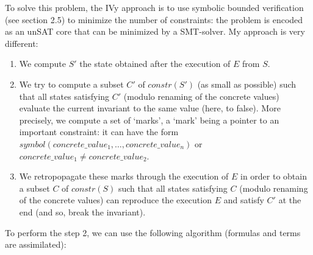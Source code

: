 \documentclass[11pt,a4paper,oldfontcommands,openany]{memoir}
\begin{document}
    To solve this problem, the IVy approach is to use symbolic bounded verification (see section 2.5) to minimize the number of constraints: the problem is encoded as an unSAT core that can be minimized by a SMT-solver.
    My approach is very different:
    \begin{enumerate}
        \item We compute \(S'\) the state obtained after the execution of \(E\) from \(S\).
        \item We try to compute a subset \(C'\) of \(constr(S')\) (as small as possible) such that all states satisfying \(C'\) (modulo renaming of the concrete values)
        evaluate the current invariant to the same value (here, to false). More precisely, we compute a set of `marks', a `mark' being a pointer to an important constraint:
        it can have the form \(symbol(concrete\_value_1,\ldots,concrete\_value_n)\) or \(concrete\_value_1 \neq concrete\_value_2\).
        \item We retropopagate these marks through the execution of \(E\) in order to obtain a subset \(C\) of \(constr(S)\) such that
        all states satisfying \(C\) (modulo renaming of the concrete values) can reproduce the execution \(E\) and satisfy \(C'\) at the end (and so, break the invariant).
    \end{enumerate}

    To perform the step 2, we can use the following algorithm (formulas and terms are assimilated):
\end{document}
